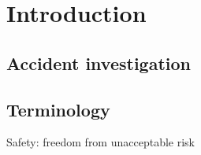 









\chapter{Introduction}

\section{Accident investigation}


\section{Terminology}
Safety: freedom from unacceptable risk

